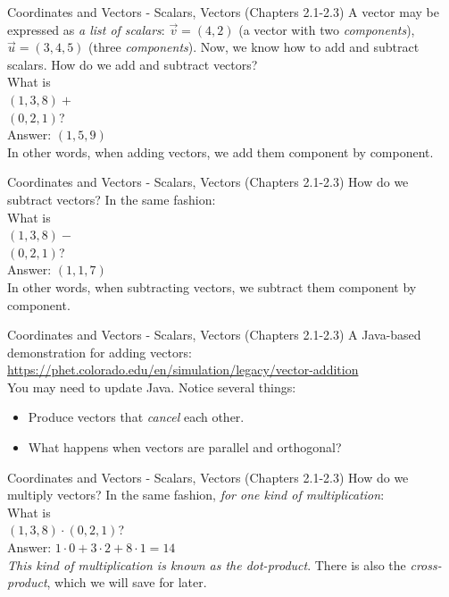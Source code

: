 \documentclass{beamer}
\begin{document}
\begin{frame}{Coordinates and Vectors - Scalars, Vectors (Chapters 2.1-2.3)}
A vector may be expressed as \textit{a list of scalars}: $\vec{v} = (4,2)$ (a vector with two \textit{components}), $\vec{u} = (3,4,5)$ (three \textit{components}).  Now, we know how to add and subtract scalars.  How do we add and subtract vectors? \\
\vspace{0.5cm}
What is\\
$(1,3,8)+$\\ $(0,2,1)$? \\
Answer: $(1,5,9)$ \\
\vspace{0.5cm}
In other words, when adding vectors, we add them component by component.
\end{frame}

\begin{frame}{Coordinates and Vectors - Scalars, Vectors (Chapters 2.1-2.3)}
How do we subtract vectors? In the same fashion:\\
\vspace{0.5cm}
What is\\
$(1,3,8)-$\\ $(0,2,1)$? \\
Answer: $(1,1,7)$ \\
\vspace{0.5cm}
In other words, when subtracting vectors, we subtract them component by component.
\end{frame}

\begin{frame}{Coordinates and Vectors - Scalars, Vectors (Chapters 2.1-2.3)}
A Java-based demonstration for adding vectors: \\
\vspace{0.5cm}
\url{https://phet.colorado.edu/en/simulation/legacy/vector-addition}
\vspace{0.5cm} \\
You may need to update Java.  Notice several things:
\begin{itemize}
\item Produce vectors that \textit{cancel} each other.
\item What happens when vectors are parallel and orthogonal?
\end{itemize}
\end{frame}

\begin{frame}{Coordinates and Vectors - Scalars, Vectors (Chapters 2.1-2.3)}
How do we multiply vectors? In the same fashion, \textit{for one kind of multiplication}:\\
\vspace{0.5cm}
What is\\
$(1,3,8)\cdot (0,2,1)$? \\
Answer: $1\cdot 0 + 3 \cdot 2 + 8 \cdot 1 = 14$ \\
\vspace{0.5cm}
\textit{This kind of multiplication is known as the dot-product}.  There is also the \textit{cross-product}, which we will save for later.
\end{frame}
\end{document}
